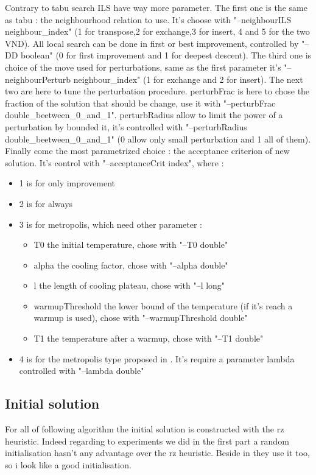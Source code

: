 \documentclass[12pt,a4paper]{article}
\begin{document}
Contrary to tabu search ILS have way more parameter. The first one is the same as tabu : the neighbourhood relation to use. It's choose with "--neighbourILS neighbour\_index" (1 for transpose,2 for exchange,3 for insert, 4 and 5 for the two VND). All local search can be done in first or best improvement, controlled by "--DD boolean" (0 for first improvement and 1 for deepest descent). The third one is choice of the move used for perturbations, same as the first parameter it's "--neighbourPerturb neighbour\_index" (1 for exchange and 2 for insert). The next two are here to tune the perturbation procedure. perturbFrac is here to chose the fraction of the solution that should be change, use it with "--perturbFrac double\_beetween\_0\_and\_1". perturbRadius allow to limit the power of a perturbation by bounded it, it's controlled with "--perturbRadius double\_beetween\_0\_and\_1" (0 allow only small perturbation and 1 all of them). Finally come the most parametrized choice : the acceptance criterion of new solution. It's control with "--acceptanceCrit index", where :
\begin{itemize}
\item
1 is for only improvement
\item
2 is for always
\item
3 is for metropolis, which need other parameter :
\begin{itemize}
\item
T0 the initial temperature, chose with "--T0 double"
\item
alpha the cooling factor, chose with "--alpha double"
\item
l the length of cooling plateau, chose with "--l long"
\item
warmupThreshold the lower bound of the temperature (if it's reach a warmup is used), chose with "--warmupThreshold double"
\item
T1 the temperature after a warmup, chose with "--T1 double"
\end{itemize}
\item
4 is for the metropolis type proposed in \cite{Ruiz06asimple}. It's require a parameter lambda controlled with "--lambda double"
\end{itemize}

\subsection{Initial solution}

For all of following algorithm the initial solution is constructed with the rz heuristic. Indeed regarding to experiments we did in the first part a random initialisation hasn't any advantage over the rz heuristic. Beside in \cite{Pan201231} they use it too, so i look like a good initialisation.
\end{document}
